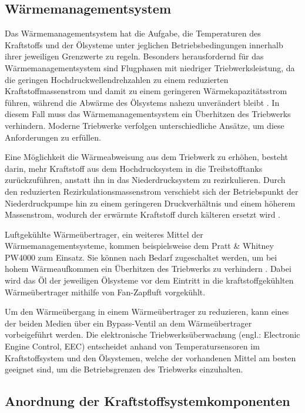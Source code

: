 \subsection{Wärmemanagementsystem}

Das Wärmemanagementsystem hat die Aufgabe, die Temperaturen des Kraftstoffs und der Ölsysteme unter jeglichen Betriebsbedingungen innerhalb ihrer jeweiligen Grenzwerte zu regeln. Besonders herausfordernd für das Wärmemanagementsystem sind Flugphasen mit niedriger Triebwerksleistung, da die geringen Hochdruckwellendrehzahlen zu einem reduzierten Kraftstoffmassenstrom und damit zu einem geringeren Wärmekapazitätsstrom führen, während die Abwärme des Ölsystems nahezu unverändert bleibt \cite{Braunling.2015}. In diesem Fall muss das Wärmemanagementsystem ein Überhitzen des Triebwerks verhindern. Moderne Triebwerke verfolgen unterschiedliche Ansätze, um diese Anforderungen zu erfüllen. 

Eine Möglichkeit die Wärmeabweisung aus dem Triebwerk zu erhöhen, besteht darin, mehr Kraftstoff aus dem Hochdrucksystem in die Treibstofftanks zurückzuführen, anstatt ihn in das Niederdrucksystem zu rezirkulieren. Durch den reduzierten Rezirkulationsmassenstrom verschiebt sich der Betriebspunkt der Niederdruckpumpe hin zu einem geringeren Druckverhältnis und einem höherem Massenstrom, wodurch der erwärmte Kraftstoff durch kälteren  ersetzt wird \cite{LinkeDiesinger.2014}. 

Luftgekühlte Wärmeübertrager, ein weiteres Mittel der Wärmemanagementsysteme, kommen beispielsweise dem Pratt \& Whitney PW4000 zum Einsatz. Sie können nach Bedarf zugeschaltet werden, um bei hohem Wärmeaufkommen ein Überhitzen des Triebwerks zu verhindern \cite{LinkeDiesinger.2014}. Dabei wird das Öl der jeweiligen Ölsysteme vor dem Eintritt in die kraftstoffgekühlten Wärmeübertrager mithilfe von Fan-Zapfluft vorgekühlt. 

Um den Wärmeübergang in einem Wärmeübertrager zu reduzieren, kann eines der beiden Medien über ein Bypass-Ventil an dem Wärmeübertrager vorbeigeführt werden. Die elektronische Triebwerksüberwachung (engl.: Electronic Engine Control, EEC) entscheidet anhand von Temperatursensoren im Kraftstoffsystem und den Ölsystemen, welche der vorhandenen Mittel am besten geeignet sind, um die Betriebsgrenzen des Triebwerks einzuhalten. \cite{LinkeDiesinger.2014}

\subsection{Anordnung der Kraftstoffsystemkomponenten}

